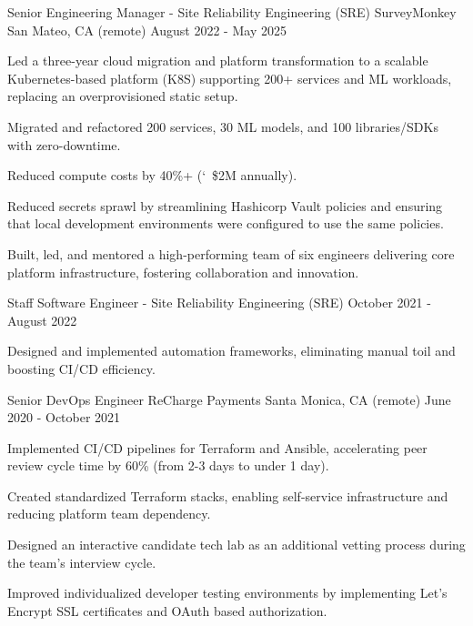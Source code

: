 \begin{cventries}
  \cventry
    {Senior Engineering Manager - Site Reliability Engineering (SRE)} %
    {SurveyMonkey} %
    {San Mateo, CA  (remote)} %
    {August 2022 - May 2025} %
    {
      \begin{cvitems} %
        \item {Led a three-year cloud migration and platform transformation to a scalable Kubernetes-based platform (K8S) supporting 200+ services and ML workloads, replacing an overprovisioned static setup.}
        \item {Migrated and refactored 200 services, 30 ML models, and 100 libraries/SDKs with zero-downtime.}
        \item {Reduced compute costs by 40\%+ (\char`~\$2M annually).}
        \item {Reduced secrets sprawl by streamlining Hashicorp Vault policies and ensuring that local development environments were configured to use the same policies.}
        \item {Built, led, and mentored a high-performing team of six engineers delivering core platform infrastructure, fostering collaboration and innovation.}
      \end{cvitems}
    }

  \cventry
    {Staff Software Engineer - Site Reliability Engineering (SRE)} %
    {} %
    {} %
    {October 2021 - August 2022} %
    {
      \begin{cvitems}
        \item {Designed and implemented automation frameworks, eliminating manual toil and boosting CI/CD efficiency.}
      \end{cvitems}
    }

  \cventry
  {Senior DevOps Engineer} %
  {ReCharge Payments} %
  {Santa Monica, CA (remote)} %
  {June 2020 - October 2021} %
  { 
    \begin{cvitems} %
      \item {Implemented CI/CD pipelines for Terraform and Ansible, accelerating peer review cycle time by 60\% (from 2-3 days to under 1 day).}
      \item {Created standardized Terraform stacks, enabling self-service infrastructure and reducing platform team dependency.}
      \item {Designed an interactive candidate tech lab as an additional vetting process during the team's interview cycle.}
      \item {Improved individualized developer testing environments by implementing Let's Encrypt SSL certificates and OAuth based authorization.}
    \end{cvitems}
  }


\end{cventries}
